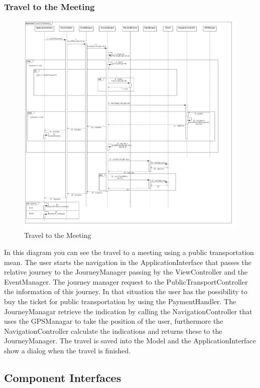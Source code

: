 \subsubsection{Travel to the Meeting}
\begin{figure}[H]
\centering
\includegraphics[scale=0.25]{images/TravelToTheMeeting}
\caption{Travel to the Meeting}
\end{figure}In this diagram you can see the travel to a meeting using a public transportation mean. The user starts the navigation in the ApplicationInterface that passes the relative journey to the JourneyManager passing by the ViewController and the EventManager. The journey manager request to the PublicTransportController the information of this journey. In that situation the user has the possibility to buy the ticket for public transportation by using the PaymentHandler. The JourneyManagar retrieve the indication by calling the NavigationController that uses the GPSManagar to take the position of the user, furthermore the NavigationController calculate the indications and returns these to the JourneyManager. The travel is saved into the Model and the ApplicationInterface show a dialog when the travel is finished.

\clearpage
\subsection{Component Interfaces}

